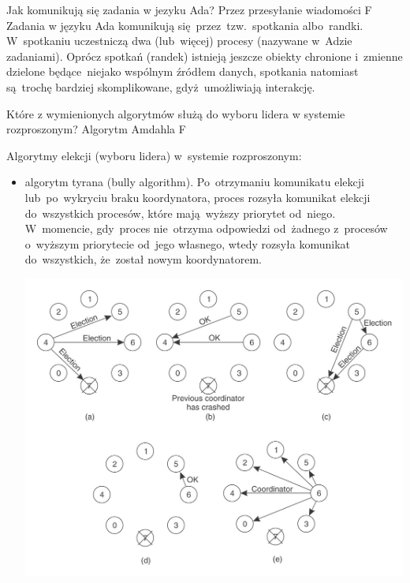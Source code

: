 \answerB
{Jak komunikują się zadania w jezyku Ada?}
{Przez przesyłanie wiadomości}
{F}
{Zadania w języku Ada komunikują się~przez~tzw.~spotkania albo~randki. W~spotkaniu uczestniczą dwa (lub~więcej) procesy (nazywane w~Adzie zadaniami). Oprócz spotkań (randek) istnieją jeszcze obiekty chronione i~zmienne dzielone będące~niejako wspólnym źródłem danych, spotkania natomiast są~trochę bardziej skomplikowane, gdyż~umożliwiają interakcję.}

\answerB
{Które z wymienionych algorytmów służą do wyboru lidera w systemie rozproszonym?}
{Algorytm Amdahla}
{F}
{Algorytmy elekcji (wyboru lidera) w~systemie rozproszonym:
\begin{itemize}

\item algorytm tyrana (bully algorithm). Po~otrzymaniu komunikatu elekcji lub~po~wykryciu braku koordynatora, proces rozsyła komunikat elekcji do~wszystkich procesów, które mają~wyższy priorytet od~niego. W~momencie, gdy~proces nie~otrzyma odpowiedzi od~żadnego z~procesów o~wyższym priorytecie od~jego własnego, wtedy rozsyła komunikat do~wszystkich, że~został nowym koordynatorem.

\begin{center}
\includegraphics[width=16.5cm]{16/tyran}
\end{center}


\end{itemize}}
